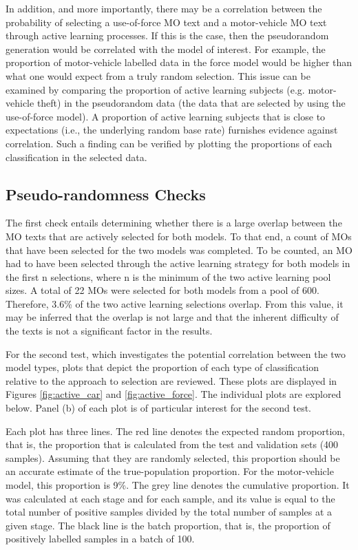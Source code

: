 In addition, and more importantly, there may be a correlation between the probability of selecting a use-of-force MO text and a motor-vehicle MO text through active learning processes. If this is the case, then the pseudorandom generation would be correlated with the model of interest. For example, the proportion of motor-vehicle labelled data in the force model would be higher than what one would expect from a truly random selection. This issue can be examined by comparing the proportion of active learning subjects (e.g. motor-vehicle theft) in the pseudorandom data (the data that are selected by using the use-of-force model). A proportion of active learning subjects that is close to expectations (i.e., the underlying random base rate) furnishes evidence against correlation. Such a finding can be verified by plotting the proportions of each classification in the selected data. 

\subsection{Pseudo-randomness Checks}

The first check entails determining whether there is a large overlap between the MO texts that are actively selected for both models. To that end, a count of MOs that have been selected for the two models was completed. To be counted, an MO had to have been selected through the active learning strategy for both models in the first n selections, where n is the minimum of the two active learning pool sizes. A total of 22 MOs were selected for both models from a pool of 600. Therefore, 3.6\% of the two active learning selections overlap. From this value, it may be inferred that the overlap is not large and that the inherent difficulty of the texts is not a significant factor in the results.

For the second test, which investigates the potential correlation between the two model types, plots that depict the proportion of each type of classification relative to the approach to selection are reviewed. These plots are displayed in Figures \ref{fig:active_car}  and \ref{fig:active_force}. The individual plots are explored below. Panel (b) of each plot is of particular interest for the second test.

Each plot has three lines. The red line denotes the expected random proportion, that is, the proportion that is calculated from the test and validation sets (400 samples). Assuming that they are randomly selected, this proportion should be an accurate estimate of the true-population proportion. For the motor-vehicle model, this proportion is 9\%. The grey line denotes the cumulative proportion. It was calculated at each stage and for each sample, and its value is equal to the total number of positive samples divided by the total number of samples at a given stage. The black line is the batch proportion, that is, the proportion of positively labelled samples in a batch of 100.

